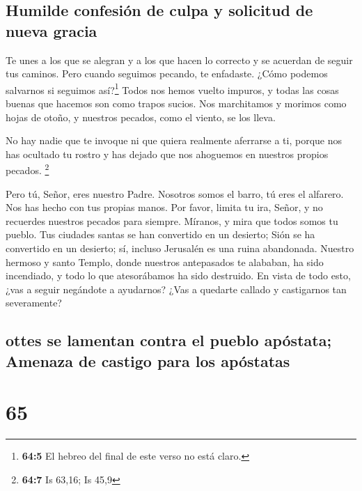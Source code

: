 \hypertarget{humilde-confesiuxf3n-de-culpa-y-solicitud-de-nueva-gracia}{%
\subsection{Humilde confesión de culpa y solicitud de nueva
gracia}\label{humilde-confesiuxf3n-de-culpa-y-solicitud-de-nueva-gracia}}

 Te unes a los que se alegran y a los que hacen lo
correcto y se acuerdan de seguir tus caminos. Pero cuando seguimos
pecando, te enfadaste. ¿Cómo podemos salvarnos si seguimos
así?\footnote{\textbf{64:5} El hebreo del final de este verso no está
  claro.}  Todos nos hemos vuelto impuros, y todas las
cosas buenas que hacemos son como trapos sucios. Nos marchitamos y
morimos como hojas de otoño, y nuestros pecados, como el viento, se los
lleva.

 No hay nadie que te invoque ni que quiera realmente
aferrarse a ti, porque nos has ocultado tu rostro y has dejado que nos
ahoguemos en nuestros propios pecados. \footnote{\textbf{64:7} Is 63,16;
  Is 45,9}

 Pero tú, Señor, eres nuestro Padre. Nosotros somos el
barro, tú eres el alfarero. Nos has hecho con tus propias manos.
 Por favor, limita tu ira, Señor, y no recuerdes nuestros
pecados para siempre. Míranos, y mira que todos somos tu pueblo.
 Tus ciudades santas se han convertido en un desierto;
Sión se ha convertido en un desierto; sí, incluso Jerusalén es una ruina
abandonada.  Nuestro hermoso y santo Templo, donde
nuestros antepasados te alababan, ha sido incendiado, y todo lo que
atesorábamos ha sido destruido.  En vista de todo esto,
¿vas a seguir negándote a ayudarnos? ¿Vas a quedarte callado y
castigarnos tan severamente?

\hypertarget{ottes-se-lamentan-contra-el-pueblo-apuxf3stata-amenaza-de-castigo-para-los-apuxf3statas}{%
\subsection{ottes se lamentan contra el pueblo apóstata; Amenaza de
castigo para los
apóstatas}\label{ottes-se-lamentan-contra-el-pueblo-apuxf3stata-amenaza-de-castigo-para-los-apuxf3statas}}

\hypertarget{section-64}{%
\section{65}\label{section-64}}

